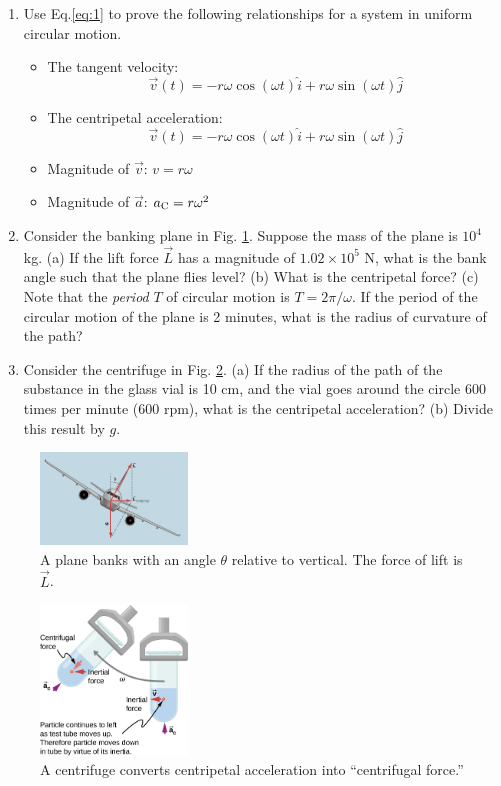 \documentclass{article}
\begin{document}
\begin{enumerate}
\item Use Eq.\ref{eq:1} to prove the following relationships for a system in uniform circular motion.
\begin{itemize}
\item The tangent velocity:
\begin{equation}
\vec{v}(t) = -r\omega \cos(\omega t)\hat{i} +  r\omega\sin(\omega t)\hat{j}
\end{equation}
\item The centripetal acceleration:
\begin{equation}
\vec{v}(t) = -r\omega \cos(\omega t)\hat{i} +  r\omega\sin(\omega t)\hat{j}
\end{equation}
\item Magnitude of $\vec{v}$: $v = r\omega$
\item Magnitude of $\vec{a}$: $a_{\rm C} = r\omega^2$
\end{itemize} \vspace{3cm}
\item Consider the banking plane in Fig. \ref{fig:1}.  Suppose the mass of the plane is $10^4$ kg.  (a) If the lift force $\vec{L}$ has a magnitude of $1.02 \times 10^5$ N, what is the bank angle such that the plane flies level? (b) What is the centripetal force? (c) Note that the \textit{period} $T$ of circular motion is $T = 2\pi/\omega$.  If the period of the circular motion of the plane is 2 minutes, what is the radius of curvature of the path? \\ \vspace{3cm}
\item Consider the centrifuge in Fig. \ref{fig:2}.  (a) If the radius of the path of the substance in the glass vial is 10 cm, and the vial goes around the circle 600 times per minute (600 rpm), what is the centripetal acceleration? (b) Divide this result by $g$. \\ \vspace{2cm}
\end{enumerate}

\begin{figure}[hb]
\centering
\includegraphics[width=0.35\textwidth]{figures/plane.jpeg}
\caption{\label{fig:1} A plane banks with an angle $\theta$ relative to vertical.  The force of lift is $\vec{L}$.}
\end{figure}

\begin{figure}[hb]
\centering
\includegraphics[width=0.35\textwidth]{figures/cent.jpeg}
\caption{\label{fig:2} A centrifuge converts centripetal acceleration into ``centrifugal force.''}
\end{figure}
\end{document}
